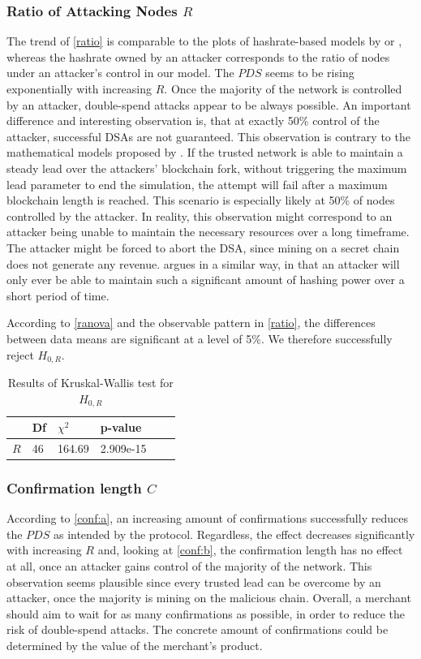 \documentclass[a4paper,12pt,twoside]{report}
\begin{document}
\subsubsection{Ratio of Attacking Nodes $R$}
The trend of \autoref{ratio} is comparable to the plots of hashrate-based models by \cite{HBDSA} or \cite{DSAwithTime}, whereas the hashrate owned by an attacker corresponds to the ratio of nodes under an attacker's control in our model. The $PDS$ seems to be rising exponentially with increasing $R$. Once the majority of the network is controlled by an attacker, double-spend attacks appear to be always possible. An important difference and interesting observation is, that at exactly 50\% control of the attacker, successful DSAs are not guaranteed. This observation is contrary to the mathematical models proposed by \cite{nakamoto2008bitcoin,HBDSA,DSAwithTime}. If the trusted network is able to maintain a steady lead over the attackers' blockchain fork, without triggering the maximum lead parameter to end the simulation, the attempt will fail after a maximum blockchain length is reached. This scenario is especially likely at 50\% of nodes controlled by the attacker. In reality, this observation might correspond to an attacker being unable to maintain the necessary resources over a long timeframe. The attacker might be forced to abort the DSA, since mining on a secret chain does not generate any revenue. \cite{longestchain} argues in a similar way, in that an attacker will only ever be able to maintain such a significant amount of hashing power over a short period of time. 

According to \autoref{ranova} and the observable pattern in \autoref{ratio}, the differences between data means are significant at a level of 5\%. We therefore successfully reject $H_{0,R}$.
\begin{table}[hb]
\centering
\begin{tabular}{|l|l|l|l|l|l|} \hline
& Df & $\chi^{2}$ & p-value \\ \hline
$R$ & 46 & 164.69 & 2.909e-15 \\ \hline
\end{tabular}
\caption{Results of Kruskal-Wallis test for $H_{0,R}$}
\label{ranova}
\end{table}
\subsubsection{Confirmation length $C$}
According to \autoref{conf:a}, an increasing amount of confirmations successfully reduces the $PDS$ as intended by the protocol. Regardless, the effect decreases significantly with increasing $R$ and, looking at \autoref{conf:b}, the confirmation length has no effect at all, once an attacker gains control of the majority of the network. This observation seems plausible since every trusted lead can be overcome by an attacker, once the majority is mining on the malicious chain. Overall, a merchant should aim to wait for as many confirmations as possible, in order to reduce the risk of double-spend attacks. The concrete amount of confirmations could be determined by the value of the merchant's product.
\end{document}
